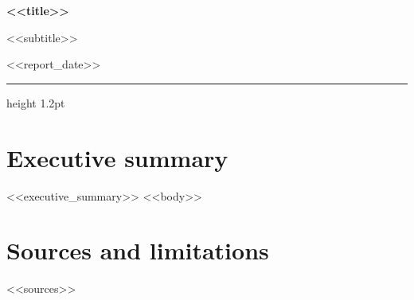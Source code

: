 \documentclass[11pt,a4paper]{article}
\begin{document}
{\huge\sffamily\bfseries\color{OfinNavy}<<title>>\par}
{\large\sffamily\color{OfinGray}<<subtitle>>\par}
{\small\sffamily\color{OfinGray}<<report_date>>\par}
\vspace{3mm}
{\color{OfinNavy}\hrule height 1.2pt}
\section*{Executive summary}
<<executive_summary>>
<<body>>
\section*{Sources and limitations}
<<sources>>
\end{document}
